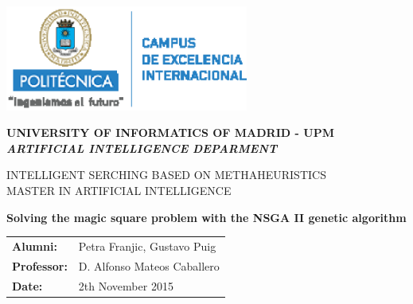 %
%

%

\graphicspath{ {Graphics/} }

\begin{titlepage}

	\begin{center}

	\includegraphics[width = 8cm] {./Graphics/logocei.eps}
		\vspace{1cm}

		{\Large{\textbf{UNIVERSITY OF INFORMATICS OF MADRID - UPM}}}
		\\
		{\it \large{\textbf{ARTIFICIAL INTELLIGENCE DEPARMENT}}}
		\vspace{1cm}

		{\large INTELLIGENT SERCHING BASED ON METHAHEURISTICS\\MASTER IN ARTIFICIAL INTELLIGENCE}
		\vspace{1cm}

		\textbf{\Large Solving the magic square problem with the NSGA II genetic algorithm}
		\vspace{6cm}
	\end{center}

	\begin{flushright}
		\begin{tabular}{ll}
			\large{\textbf{Alumni:}}	&
			\large{Petra Franjic, Gustavo Puig} \\

			\large{\textbf{Professor:}}	&
			\large{D. Alfonso Mateos Caballero} \\

			\large{\textbf{Date:}}	&
			\large{2th November 2015} \\
		\end{tabular}
	\end{flushright}

\end{titlepage}
